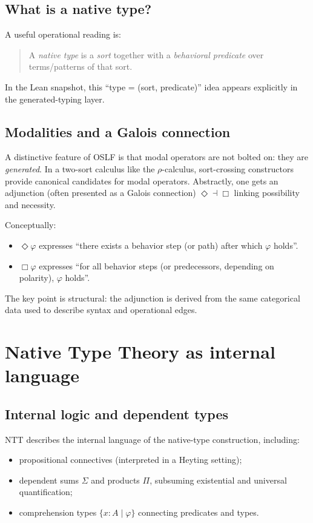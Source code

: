 \documentclass[11pt]{article}
\newcommand{\OSLF}{\textsf{OSLF}}
\newcommand{\NTT}{\textsf{NTT}}
\newcommand{\rhocalc}{\textsf{\(\rho\)}-calculus}
\newcommand{\bx}{\Box}
\newcommand{\dia}{\Diamond}
\begin{document}
\subsection{What is a native type?}
A useful operational reading is:

\begin{quote}
A \emph{native type} is a \emph{sort} together with a \emph{behavioral predicate} over terms/patterns of that sort.
\end{quote}

In the Lean snapshot, this ``type = (sort, predicate)'' idea appears explicitly in the generated-typing layer.

\subsection{Modalities and a Galois connection}
A distinctive feature of \OSLF{} is that modal operators are not bolted on: they are \emph{generated}.
In a two-sort calculus like the \rhocalc{}, sort-crossing constructors provide canonical candidates
for modal operators. Abstractly, one gets an adjunction (often presented as a Galois connection)
\(\dia \dashv \bx\) linking possibility and necessity.

Conceptually:

\begin{itemize}
\item \(\dia \varphi\) expresses ``there exists a behavior step (or path) after which \(\varphi\) holds''.
\item \(\bx \varphi\) expresses ``for all behavior steps (or predecessors, depending on polarity),
\(\varphi\) holds''.
\end{itemize}

The key point is structural: the adjunction is derived from the same categorical data used to
describe syntax and operational edges.

\section{Native Type Theory as internal language}

\subsection{Internal logic and dependent types}
\NTT{} describes the internal language of the native-type construction, including:

\begin{itemize}
\item propositional connectives (interpreted in a Heyting setting);
\item dependent sums \(\Sigma\) and products \(\Pi\), subsuming existential and universal quantification;
\item comprehension types \(\{x:A \mid \varphi\}\) connecting predicates and types.
\end{itemize}
\end{document}
